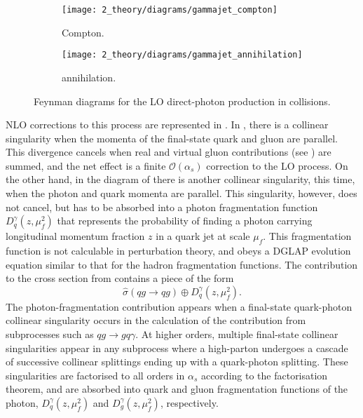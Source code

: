 \begin{figure}[ht!]
    \centering
    \begin{subfigure}[h]{0.49\linewidth}
        \centering
        \texttt{[image: 2\_theory/diagrams/gammajet\_compton]}
        \caption{Compton.}
        \label{fig:theory:sm:prompt_photon:feynman_lo_direct:compton}
    \end{subfigure}
    \hfill
    \begin{subfigure}[h]{0.49\linewidth}
        \centering
        \texttt{[image: 2\_theory/diagrams/gammajet\_annihilation]}
        \caption{annihilation.}
        \label{fig:theory:sm:prompt_photon:feynman_lo_direct:annihilation}
    \end{subfigure}
    \caption{Feynman diagrams for the \ac{LO} direct-photon production in \pp collisions.}
    \label{fig:theory:sm:prompt_photon:feynman_lo_direct}
\end{figure}

\ac{NLO} corrections to this process are represented in \Fig{\ref{fig:theory:sm:prompt_photon:feynman_nlo_direct}}. In \Fig{\ref{fig:theory:sm:prompt_photon:feynman_nlo_direct:gluon}}, there is a collinear singularity when the momenta of the final-state quark and gluon are parallel. This divergence cancels when real and virtual gluon contributions (see \Fig{\ref{fig:theory:sm:prompt_photon:feynman_nlo_direct:gluon_virtual}}) are summed, and the net effect is a finite \(\mathcal{O}(\alpha_s)\) correction to the \ac{LO} process. On the other hand, in the diagram of \Fig{\ref{fig:theory:sm:prompt_photon:feynman_nlo_direct:photon}} there is another collinear singularity, this time, when the photon and quark momenta are parallel. This singularity, however, does not cancel, but has to be absorbed into a photon fragmentation function \(D_q^{\gamma} (z, \mu^2_f )\) that represents the probability of finding a photon carrying longitudinal momentum fraction \(z\) in a quark jet at scale \(\mu_f\). This fragmentation function is not calculable in perturbation theory, and obeys a DGLAP evolution equation similar to that for the hadron fragmentation functions. The contribution to the cross section from \Fig{\ref{fig:theory:sm:prompt_photon:feynman_nlo_direct:photon}} contains a piece of the form
\begin{equation}
    \label{eq:theory:sm:prompt_photon:fragmentation_contribution}
    \hat{\sigma}(qg \to qg) \oplus D_q^{\gamma} \left(z, \mu_f^2\right).
\end{equation}
The photon-fragmentation contribution appears when a final-state quark-photon collinear singularity occurs in the calculation of the contribution from subprocesses such as \(qg \to gq\gamma\). At higher orders, multiple final-state collinear singularities appear in any subprocess where a high-\pt parton undergoes a cascade of successive collinear splittings ending up with a quark-photon splitting. These singularities are factorised to all orders in \(\alpha_s\) according to the factorisation theorem, and are absorbed into quark and gluon fragmentation functions of the photon, \(D_q^{\gamma} \left(z, \mu_f^2\right)\) and \(D_g^{\gamma} \left(z, \mu_f^2\right)\), respectively.

